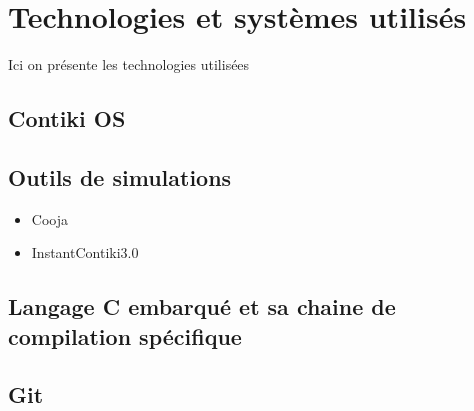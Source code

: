 \section{Technologies et systèmes utilisés}
	Ici on présente les technologies utilisées
	\subsection{Contiki OS}
	\subsection{Outils de simulations}
		\begin{itemize}
			\item Cooja
			\item InstantContiki3.0
		\end{itemize}
	\subsection{Langage C embarqué et sa chaine de compilation spécifique}
	\subsection{Git}
